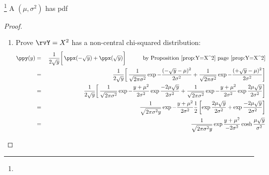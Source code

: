 \begin{definition}
\footnote{
  }
A  $(\mu,\sigma^2)$
has pdf
\end{definition}

\begin{theorem}
\end{theorem}
\begin{proof}
\begin{enumerate}
\item Prove $\rvY=X^2$ has a non-central chi-squared distribution:
\begin{eqnarray*}
  \ppy(y)
    &=& \left.\left.\frac{1}{2\sqrt{y}}\right[
        \ppx(-\sqrt{y}) + \ppx( \sqrt{y}) \right]
        \hspace{1cm}\mbox{by Proposition~\ref{prop:Y=X^2} page~\pageref{prop:Y=X^2}}
  \\&=& \left.\left.\frac{1}{2\sqrt{y}}\right[
        \frac{1}{\sqrt{2\pi\sigma^2}} \exp{-\frac{(-\sqrt{y}-\mu)^2}{2\sigma^2}}+
        \frac{1}{\sqrt{2\pi\sigma^2}} \exp{-\frac{(+\sqrt{y}-\mu)^2}{2\sigma^2}}
        \right]
  \\&=& \left.\left.\frac{1}{2\sqrt{y}}\right[
        \frac{1}{\sqrt{2\pi\sigma^2}} \exp{-\frac{y+\mu^2 }{2\sigma^2}} \exp{\frac{-2\mu\sqrt{y}}{2\sigma^2}}+
        \frac{1}{\sqrt{2\pi\sigma^2}} \exp{-\frac{y+\mu^2 }{2\sigma^2}} \exp{\frac{ 2\mu\sqrt{y}}{2\sigma^2}}
        \right]
  \\&=& \frac{1}{\sqrt{2\pi\sigma^2y}} \exp{-\frac{y+\mu^2 }{2\sigma^2}}
        \frac{1}{2}
        \left[
          \exp{\frac{ 2\mu\sqrt{y}}{2\sigma^2}} +
          \exp{\frac{-2\mu\sqrt{y}}{2\sigma^2}}
        \right]
  \\&=& \frac{1}{\sqrt{2\pi\sigma^2y}} \exp{\frac{y+\mu^2 }{-2\sigma^2}}
          \cosh{\frac{ \mu\sqrt{y}}{\sigma^2}}
\end{eqnarray*}
\end{enumerate}
\end{proof}

